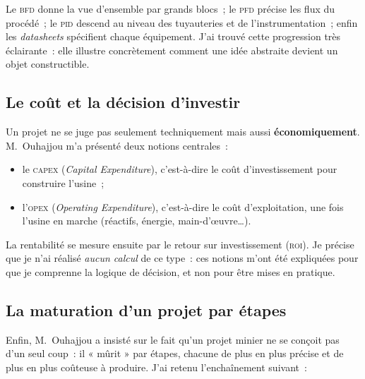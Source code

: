 \documentclass[12pt,a4paper,oneside]{report}
\newcommand{\sig}[1]{\textsc{#1}}
\begin{document}
Le \sig{bfd} donne la vue d'ensemble par grands blocs~; le \sig{pfd} précise les flux du procédé~; le \sig{pid} descend au niveau des tuyauteries et de l'instrumentation~; enfin les \textit{datasheets} spécifient chaque équipement. J'ai trouvé cette progression très éclairante~: elle illustre concrètement comment une idée abstraite devient un objet constructible.

\subsection{Le coût et la décision d'investir}

Un projet ne se juge pas seulement techniquement mais aussi \textbf{économiquement}. M.~Ouhajjou m'a présenté deux notions centrales~:

\begin{itemize}
\item le \sig{capex} (\textit{Capital Expenditure}), c'est-à-dire le coût d'investissement pour construire l'usine~;
\item l'\sig{opex} (\textit{Operating Expenditure}), c'est-à-dire le coût d'exploitation, une fois l'usine en marche (réactifs, énergie, main-d'œuvre\ldots).
\end{itemize}

La rentabilité se mesure ensuite par le retour sur investissement (\sig{roi}). Je précise que je n'ai réalisé \emph{aucun calcul} de ce type~: ces notions m'ont été expliquées pour que je comprenne la logique de décision, et non pour être mises en pratique.

\subsection{La maturation d'un projet par étapes}

Enfin, M.~Ouhajjou a insisté sur le fait qu'un projet minier ne se conçoit pas d'un seul coup~: il « mûrit » par étapes, chacune de plus en plus précise et de plus en plus coûteuse à produire. J'ai retenu l'enchaînement suivant~:
\end{document}

